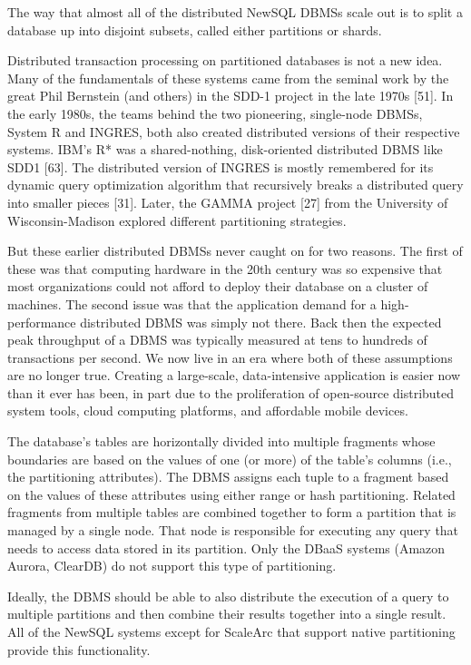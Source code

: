 \documentclass[a4paper,11pt,twoside,openright]{article}
\begin{document}
The way that almost all of the distributed NewSQL DBMSs scale out is to
split a database up into disjoint subsets, called either partitions or
shards.

Distributed transaction processing on partitioned databases is not a new
idea. Many of the fundamentals of these systems came from the seminal
work by the great Phil Bernstein (and others) in the SDD-1 project in
the late 1970s {[}51{]}. In the early 1980s, the teams behind the two
pioneering, single-node DBMSs, System R and INGRES, both also created
distributed versions of their respective systems. IBM's R* was a
shared-nothing, disk-oriented distributed DBMS like SDD1 {[}63{]}. The
distributed version of INGRES is mostly remembered for its dynamic query
optimization algorithm that recursively breaks a distributed query into
smaller pieces {[}31{]}. Later, the GAMMA project {[}27{]} from the
University of Wisconsin-Madison explored different partitioning
strategies.

But these earlier distributed DBMSs never caught on for two reasons. The
first of these was that computing hardware in the 20th century was so
expensive that most organizations could not afford to deploy their
database on a cluster of machines. The second issue was that the
application demand for a high-performance distributed DBMS was simply
not there. Back then the expected peak throughput of a DBMS was
typically measured at tens to hundreds of transactions per second. We
now live in an era where both of these assumptions are no longer true.
Creating a large-scale, data-intensive application is easier now than it
ever has been, in part due to the proliferation of open-source
distributed system tools, cloud computing platforms, and affordable
mobile devices.

The database's tables are horizontally divided into multiple fragments
whose boundaries are based on the values of one (or more) of the table's
columns (i.e., the partitioning attributes). The DBMS assigns each tuple
to a fragment based on the values of these attributes using either range
or hash partitioning. Related fragments from multiple tables are
combined together to form a partition that is managed by a single node.
That node is responsible for executing any query that needs to access
data stored in its partition. Only the DBaaS systems (Amazon Aurora,
ClearDB) do not support this type of partitioning.

Ideally, the DBMS should be able to also distribute the execution of a
query to multiple partitions and then combine their results together
into a single result. All of the NewSQL systems except for ScaleArc that
support native partitioning provide this functionality.
\end{document}
